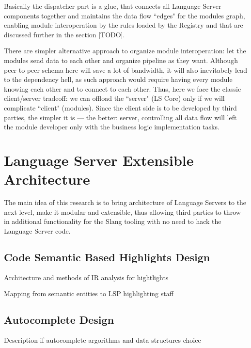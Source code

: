 Basically the dispatcher part is a glue, that connects all Language Server components together and 
maintains the data flow ``edges" for the modules graph, enabling module interoperation by the
rules loaded by the Registry and that are discussed further in the section [TODO].

There are simpler alternative approach to organize module interoperation: let the modules send data 
to each other and organize pipeline as they want. Although peer-to-peer schema here will save a lot of bandwidth, 
it will also inevitabely lead to the dependency hell, 
as such approach would require having every module knowing each other and to connect to each other. 
Thus, here we face the classic client/server tradeoff: we can offload the ``server" (LS Core) only
if we will complicate ``client" (modules). 
Since the client side is to be developed by third parties, the simpler it is — the better: 
server, controlling all data flow will left the module developer only with the business logic implementation tasks. 

\section{Language Server Extensible Architecture}
\label{sec:met:ls_mod}
The main idea of this research is to bring architecture of Language Servers to the next level,
make it modular and extensible, thus allowing third parties to throw in additional functionality for the Slang tooling
with no need to hack the Language Server code.

\subsection{Code Semantic Based Highlights Design}
\label{sec:met:ls_mod:semhighlight}
Architecture and methods of IR analysis for hightlights

Mapping from semantic entities to LSP highlighting staff

\subsection{Autocomplete Design}
\label{sec:impl:ls_mod:autocomplete}
Description if autocomplete argorithms and data structures choice